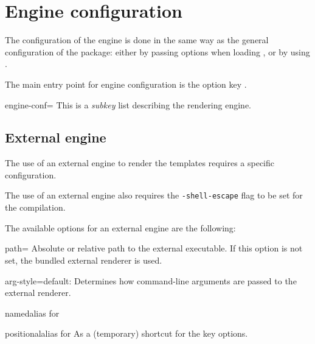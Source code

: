 \section{Engine configuration}
\label{sec:engine-configuration}

The configuration of the engine is done in the same way as the general
configuration of the package: either by passing options when loading
, or by using . %

The main entry point for engine configuration is the option key
. %

\begin{docKey}[][doc description=\preambleonly*]{engine-conf}{=}{}
  This is a \emph{subkey} list describing the rendering engine. %
\end{docKey}

\subsection{External engine}
\label{ssec:external-engine-config}

The use of an external engine to render the templates requires a specific
configuration. %

\begin{blocktip}
  The use of an external engine also requires the \verb+-shell-escape+ flag to
  be set for the compilation. %
\end{blocktip}

The available options for an external engine are the following: %

\begin{docKey}{path}{=}{}%
  Absolute or relative path to the external executable. %
  If this option is not set, the bundled external renderer is used. %
\end{docKey}

\begin{docKey}{arg-style}{=\textbar{}}{default: }%
  Determines how command-line arguments are passed to the external
  renderer. %
\end{docKey}

\begin{docKey}{named}{}{alias for }%
\end{docKey}
\vspace*{-0.5cm}
\begin{docKey}{positional}{}{alias for }%
  As a (temporary) shortcut for the  key options. %
\end{docKey}

